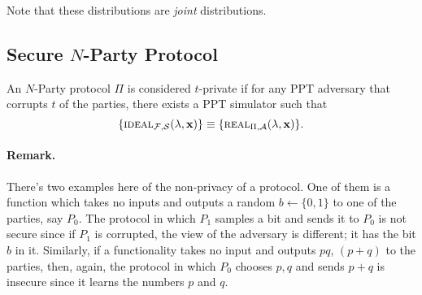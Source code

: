 Note that these distributions are \textit{joint} distributions.

\subsection{Secure $N$-Party Protocol}

\begin{definition}
	An $N$-Party protocol $\Pi$ is considered $t$-private if for any PPT adversary that corrupts $t$ of the parties, there exists a PPT simulator such that
	$$\{\textsc{ideal}_{\mathcal{F},\mathcal{S}}(\lambda,\mathbf{x})\}\equiv\{\textsc{real}_{\Pi,\mathcal{A}}(\lambda,\mathbf{x})\}.$$
\end{definition}

\paragraph{Remark.} There's two examples here of the non-privacy of a protocol. One of them is a function which takes no inputs and outputs a random $b\leftarrow\{0,1\}$ to one of the parties, say $P_0$. The protocol in which $P_1$ samples a bit and sends it to $P_0$ is not secure since if $P_1$ is corrupted, the view of the adversary is different; it has the bit $b$ in it. Similarly, if a functionality takes no input and outputs $pq$, $(p+q)$ to the parties, then, again, the protocol in which $P_0$ chooses $p,q$ and sends $p+q$ is insecure since it learns the numbers $p$ and $q$.